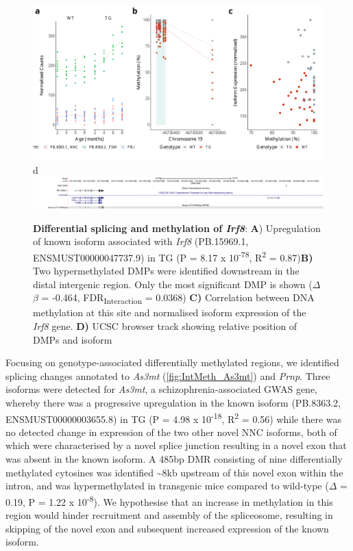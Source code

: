 \begin{figure}[]
	\includegraphics[page=5,scale = 0.4]{Figures/WholeDifferentialAnalysis_DMPDMR.pdf}
	\\
	\hspace*{0.2cm}\vspace{0.5cm}\large d
	\\
	\includegraphics[page=1,trim={1.5cm 0 0 0},scale = 0.9]{Figures/IRF8_DMP.pdf}
	\captionsetup{width=0.95\textwidth}
	\caption[Differential splicing and methylation of \textit{Irf8}]%
	{\textbf{Differential splicing and methylation of \textit{Irf8}}: \textbf{A}) Upregulation of known isoform associated with \textit{Irf8} (PB.15969.1, ENSMUST00000047737.9) in TG (P = 8.17 x 10\textsuperscript{-78}, R\textsuperscript{2} = 0.87)\textbf{B)} Two hypermethylated DMPs were identified downstream in the distal intergenic region. Only the most significant DMP is shown ($\Delta$$\beta$ = -0.464, FDR\textsubscript{Interaction} = 0.0368) \textbf{C)} Correlation between DNA methylation at this site and normalised isoform expression of the \textit{Irf8} gene. \textbf{D)} UCSC browser track showing relative position of DMPs and isoform}    
	\label{fig:IntMeth_Irf8}
\end{figure}

Focusing on genotype-associated differentially methylated regions, we identified splicing changes annotated to \textit{As3mt}  (\cref{fig:IntMeth_As3mt}) and \textit{Prnp}. Three isoforms were detected for \textit{As3mt}, a schizophrenia-associated GWAS gene, whereby there was a progressive upregulation in the known isoform (PB.8363.2, ENSMUST00000003655.8) in TG (P = 4.98 x 10\textsuperscript{-18}, R\textsuperscript{2} = 0.56) while there was no detected change in expression of the two other novel NNC isoforms, both of which were characterised by a novel splice junction resulting in a novel exon that was absent in the known isoform. A 485bp DMR consisting of nine differentially methylated cytosines was identified \textasciitilde{}8kb upstream of this novel exon within the intron, and was hypermethylated in transgenic mice compared to wild-type ($\Delta$ = 0.19, P = 1.22 x 10\textsuperscript{-8}). We hypothesise that an increase in methylation in this region would hinder recruitment and assembly of the spliceosome, resulting in skipping of the novel exon and subsequent increased expression of the known isoform. 

